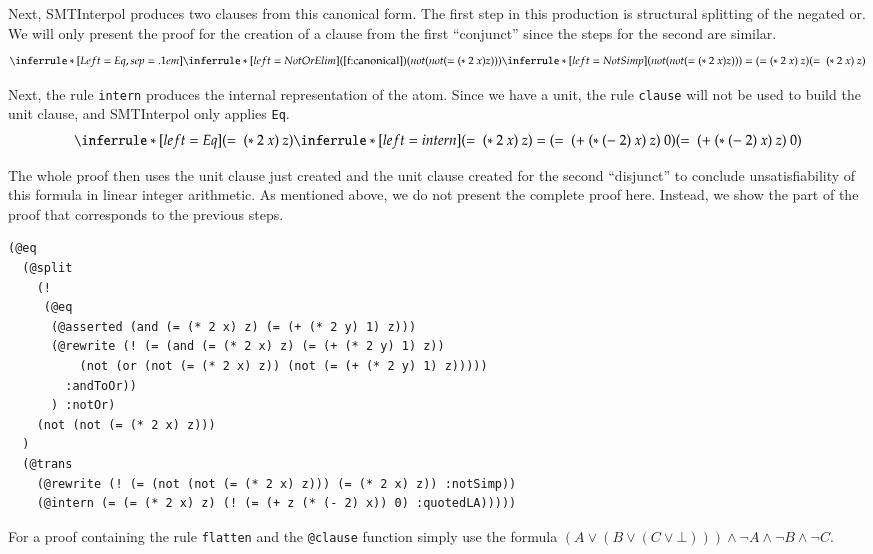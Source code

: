 \documentclass[a4paper]{article}
\newcommand\si{SMTInterpol\xspace}
\begin{document}
Next, \si produces two clauses from this canonical form.  The first step in
this production is structural splitting of the negated or.  We will only
present the proof for the creation of a clause from the first ``conjunct''
since the steps for the second are similar.
\[
\inferrule*[Left=Eq,sep=.1em]{
  \inferrule*[left=NotOrElim]{(\ref{f:canonical})}{(not (not (= (*\ 2\ x) z)))}\\
  \inferrule*[left=NotSimp]{ }{(not (not (= (*\ 2\ x) z))) =
    (= (*\ 2\ x)\ z)}}
           {(=\ (*\ 2\ x)\ z)}
\]

Next, the rule \texttt{intern} produces the internal representation of the
atom.  Since we have a unit, the rule \texttt{clause} will not be used to
build the unit clause, and \si only applies \texttt{Eq}.
\[
\inferrule*[left=Eq]{(=\ (*\ 2\ x)\ z) \\
  \inferrule*[left=intern]{ }{(=\ (*\ 2\ x)\ z) = (=\ (+\ (*\ (-\ 2)\ x)\ z)\
    0)}}
           {(=\ (+\ (*\ (-\ 2)\ x)\ z)\ 0)}
\]

The whole proof then uses the unit clause just created and the unit clause
created for the second ``disjunct'' to conclude unsatisfiability of this
formula in linear integer arithmetic.  As mentioned above, we do not present
the complete proof here.  Instead, we show the part of the proof that
corresponds to the previous steps.
\begin{verbatim}
(@eq
  (@split
    (!
     (@eq
      (@asserted (and (= (* 2 x) z) (= (+ (* 2 y) 1) z)))
      (@rewrite (! (= (and (= (* 2 x) z) (= (+ (* 2 y) 1) z))
          (not (or (not (= (* 2 x) z)) (not (= (+ (* 2 y) 1) z)))))
        :andToOr))
      ) :notOr)
    (not (not (= (* 2 x) z)))
  )
  (@trans
    (@rewrite (! (= (not (not (= (* 2 x) z))) (= (* 2 x) z)) :notSimp))
    (@intern (= (= (* 2 x) z) (! (= (+ z (* (- 2) x)) 0) :quotedLA)))))
\end{verbatim}

For a proof containing the rule \verb:flatten: and the \verb:@clause: function
simply use the formula $(A\lor(B\lor(C\lor\bot)))\land\lnot A\land\lnot
B\land\lnot C$.
\end{document}
